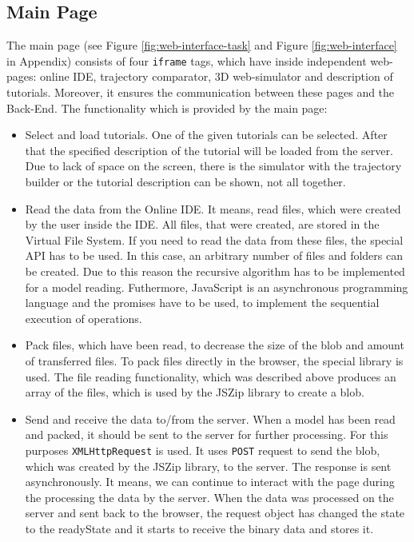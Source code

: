 \subsection{Main Page}
The main page (see Figure \ref{fig:web-interface-task} and Figure \ref{fig:web-interface} in Appendix) consists of four \texttt{iframe} tags, which have inside independent web-pages: online IDE, trajectory comparator, 3D web-simulator and description of tutorials. Moreover, it ensures the communication between these pages and the Back-End. The functionality which is provided by the main page:
\begin{itemize}
    \item Select and load tutorials. One of the given tutorials can be selected. After that the specified description of the tutorial will be loaded from the server. Due to lack of space on the screen, there is the simulator with the trajectory builder or the tutorial description can be shown, not all together.
    \item Read the data from the Online IDE. It means, read files, which were created by the user inside the IDE. All files, that were created, are stored in the Virtual File System. If you need to read the data from these files, the special API \cite{FilesystemAPI} has to be used. In this case, an arbitrary number of files and folders can be created. Due to this reason the recursive algorithm has to be implemented for a model reading. Futhermore, JavaScript is an asynchronous programming language and the promises \cite{JSPromise} have to be used, to implement the sequential execution of operations.
    \item Pack files, which have been read, to decrease the size of the blob and amount of transferred files. To pack files directly in the browser, the special library is used. The file reading functionality, which was described above produces an array of the files, which is used by the JSZip library \cite{JSZip} to create a blob.
    \item Send and receive the data to/from the server. When a model has been read and packed, it should be sent to the server for further processing. For this purposes \texttt{XMLHttpRequest} \cite{XMLHttpRequest} is used. It uses \texttt{POST} request to send the blob, which was created by the JSZip library, to the server. The response is sent asynchronously. It means, we can continue to interact with the page during the processing the data by the server. When the data was processed on the server and sent back to the browser, the request object has changed the state to the readyState and it starts to receive the binary data and stores it.

\end{itemize}
